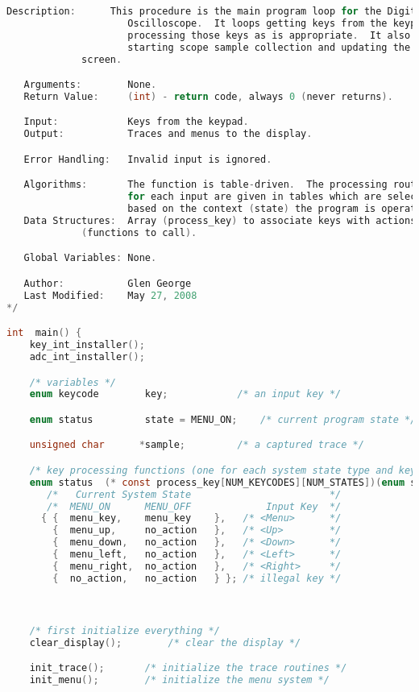 \begin{lstlisting}[language=C]
   Description:      This procedure is the main program loop for the Digital
                     Oscilloscope.  It loops getting keys from the keypad,
                     processing those keys as is appropriate.  It also handles
                     starting scope sample collection and updating the LCD
		     screen.

   Arguments:        None.
   Return Value:     (int) - return code, always 0 (never returns).

   Input:            Keys from the keypad.
   Output:           Traces and menus to the display.

   Error Handling:   Invalid input is ignored.

   Algorithms:       The function is table-driven.  The processing routines
                     for each input are given in tables which are selected
                     based on the context (state) the program is operating in.
   Data Structures:  Array (process_key) to associate keys with actions
		     (functions to call).

   Global Variables: None.

   Author:           Glen George
   Last Modified:    May 27, 2008
*/

int  main() {
	key_int_installer();
	adc_int_installer();

	/* variables */
    enum keycode        key;		    /* an input key */

    enum status         state = MENU_ON;    /* current program state */

    unsigned char      *sample;		    /* a captured trace */

    /* key processing functions (one for each system state type and key) */
    enum status  (* const process_key[NUM_KEYCODES][NUM_STATES])(enum status) =
       /*   Current System State                        */
       /*  MENU_ON      MENU_OFF             Input Key  */
      { {  menu_key,    menu_key    },   /* <Menu>      */
        {  menu_up,     no_action   },   /* <Up>        */
        {  menu_down,   no_action   },   /* <Down>      */
        {  menu_left,   no_action   },   /* <Left>      */
        {  menu_right,  no_action   },   /* <Right>     */
        {  no_action,   no_action   } }; /* illegal key */



    /* first initialize everything */
    clear_display();		/* clear the display */

    init_trace();		/* initialize the trace routines */
    init_menu();		/* initialize the menu system */



\end{lstlisting}
